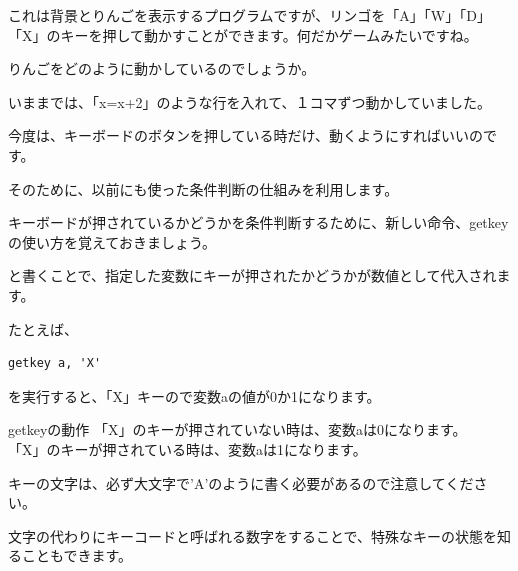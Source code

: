 これは背景とりんごを表示するプログラムですが、リンゴを「A」「W」「D」「X」のキーを押して動かすことができます。何だかゲームみたいですね。

りんごをどのように動かしているのでしょうか。

いままでは、「x=x+2」のような行を入れて、１コマずつ動かしていました。

今度は、キーボードのボタンを押している時だけ、動くようにすればいいのです。

そのために、以前にも使った条件判断の仕組みを利用します。

キーボードが押されているかどうかを条件判断するために、新しい命令、getkeyの使い方を覚えておきましょう。


と書くことで、指定した変数にキーが押されたかどうかが数値として代入されます。

たとえば、


\begin{lstlisting}[numbers=none]
getkey a, 'X'
\end{lstlisting}


を実行すると、「X」キーので変数aの値が0か1になります。


\begin{itembox}[c]{getkeyの動作}
    「X」のキーが押されていない時は、変数aは0になります。\\「X」のキーが押されている時は、変数aは1になります。
\end{itembox}

キーの文字は、必ず大文字で’A’のように書く必要があるので注意してください。

文字の代わりにキーコードと呼ばれる数字をすることで、特殊なキーの状態を知ることもできます。

